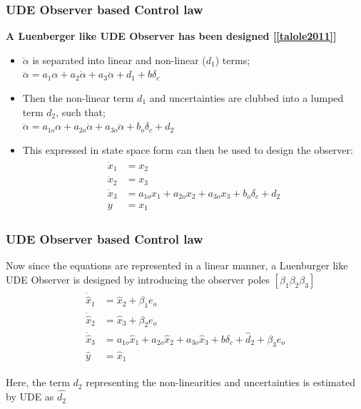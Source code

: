 \documentclass[table,10pt,red]{beamer}	%
\begin{document}
\begin{frame}
\frametitle{UDE Observer based Control law}
	\textbf{A Luenberger like UDE Observer has been designed [\ref{talole2011}] }


\begin{itemize}  %
	\item $\dddot{\alpha}$ is separated into linear and non-linear ($d_1$) terms; $\dddot{\alpha} = a_1 \alpha + a_2 \dot{\alpha} + a_3 \ddot{\alpha} + d_1 + b\delta_c$
	
	\item Then the non-linear term $d_1$ and uncertainties are clubbed into a lumped term $d_2$, such that; \\
	$\dddot{\alpha} = a_{1o} \alpha + a_{2o} \dot{\alpha} + a_{3o} \ddot{\alpha} + b_o\delta_c + d_2$\\
	
	\item This expressed in state space form can then be used to design the observer:
	\begin{eqnarray*}
		\begin{aligned}
			\dot{x}_1 &= x_2 \\
			\dot{x}_2 &= x_3 \\
			\dot{x}_3 &= a_{1o}x_1 + a_{2o}x_2 + a_{3o}x_3 + b_o \delta_c + d_2 \\
			y &= x_1 \label{rx1}
		\end{aligned}
		\label{eq5}
	\end{eqnarray*}
	
\end{itemize}

\end{frame}

\begin{frame}
\frametitle{UDE Observer based Control law}

Now since the equations are represented in a linear manner, a Luenburger like UDE Observer is designed by introducing the observer poles $[\beta_1 \beta_2 \beta_3]$
\begin{eqnarray*}
	\begin{aligned}
		\dot{\hat{x}}_1 &= \hat{x}_2 + \beta_1 e_o\\
		\dot{\hat{x}}_2 &= \hat{x}_3 + \beta_2 e_o\\
		\dot{\hat{x}}_3 &= a_{1o}\hat{x}_1 + a_{2o}\hat{x}_2 + a_{3o}\hat{x}_3 + b \delta_c + \hat{d}_2 + \beta_3 e_o\\		
		\hat{y} &= \hat{x}_1 \label{ss1}
	\end{aligned}
	\label{eq5}
\end{eqnarray*}

Here, the term $d_2$ representing the non-linearities and uncertainties is estimated by UDE  as $\hat{d_2}$

\end{frame}
\end{document}
